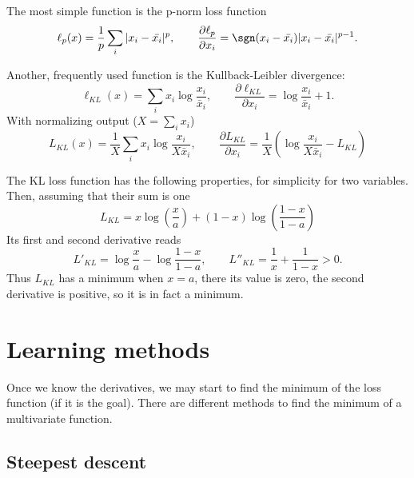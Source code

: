 \documentclass[10pt,a4paper]{article}
\begin{document}
The most simple function is the p-norm loss function
\begin{equation}
\ell_p(x) = \dfrac{1}{p} \sum_i |x_i -\bar{x_i}|^p,\qquad
\dfrac{\partial \ell_p}{\partial x_i} = \sgn(x_i -\bar{x_i})|x_i - \bar{x_i}|^{p-1}.
\end{equation}

Another, frequently used function is the Kullback-Leibler divergence:
\begin{equation}
\ell_{KL}(x) = \sum_i x_i \log\dfrac{x_i}{\bar x_i},\qquad 
\dfrac{\partial \ell_{KL}}{\partial x_i} = \log\dfrac{x_i}{\bar x_i}+1.
\end{equation}
With normalizing output ($X=\sum_i x_i$)
\begin{equation}
L_{KL}(x) = \dfrac{1}{X}\sum_i x_i \log\dfrac{x_i}{X \bar x_i},\qquad 
\dfrac{\partial L_{KL}}{\partial x_i} = \dfrac{1}{X}\left ( \log\dfrac{x_i}{X\bar x_i} - L_{KL}\right )
\end{equation}

The KL loss function has the following properties, for simplicity for two variables. Then, assuming that their sum is one
\begin{equation}
L_{KL} = x \log(\dfrac{x}{a}) + (1-x) \log(\dfrac{1-x}{1-a})
\end{equation}
Its first and second derivative reads\begin{equation}
L'_{KL} =\log\dfrac{x}{a} -\log\dfrac{1-x}{1-a},\qquad
L''_{KL} =\dfrac{1}{x} + \dfrac{1}{1-x}>0.
\end{equation}
Thus $L_{KL}$ has a minimum when $x=a$, there its value is zero, the second derivative is positive, so it is in fact a minimum.

\section{Learning methods}

Once we know the derivatives, we may start to find the minimum of the loss function (if it is the goal). There are different methods to find the minimum of a multivariate function.

\subsection{Steepest descent}
\end{document}
